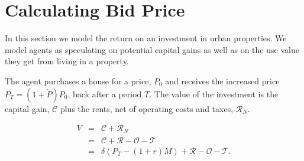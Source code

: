 \chapter[Bidding]{Calculating Bid Price}
\label{appendix-bid-price}

 In this section we model the return on an investment in urban properties. We model agents as %
 speculating on potential \glspl{capital gain} as well as on the \gls{use value} they get from living in a property. %

 The agent purchases a house for a price, $P_0$ %
 and receives the increased price $P_T = (1 + \dot P)P_0$, back after a period $T$. 
The value of the investment is the capital gain, $\mathcal{C}$ plus the rents, net of operating costs and taxes, $\mathcal{R}_N$.


\begin{eqnarray}
V &=& \mathcal{C} + \mathcal{R}_N \nonumber \\
  &=& \mathcal{C} + \mathcal{R} - \mathcal{O} - \mathcal{T} \nonumber \\
  &=& \delta \left(P_T- \left(1+r\right)M\right) + \mathcal{R} - \mathcal{O} - \mathcal{T}.
\label{eqn-property-investment-value1}
\end{eqnarray}


